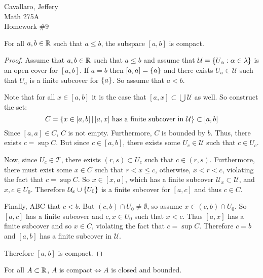\documentclass[letterpaper,12pt,fleqn]{article}
\newcommand{\T}{\mathscr{T}}
\newcommand{\U}{\mathcal{U}}
\renewcommand{\a}{\alpha}
\renewcommand{\l}{\lambda}
\begin{document}
Cavallaro, Jeffery \\
Math 275A \\
Homework \#9

\bigskip

\begin{theorem}[6.14]
  For all \(a,b\in\mathbb{R}\) such that \(a\le b\), the subspace \([a,b]\) is compact.
\end{theorem}

\begin{proof}
  Assume that \(a,b\in\mathbb{R}\) such that \(a\le b\) and assume that \(\U=\set{U_{\a}:\a\in\l}\) is an open cover for
  \([a,b]\).  If \(a=b\) then \([a,a]=\{a\}\) and there exists \(U_a\in\U\) such that \(U_a\) is a finite subcover
  for \(\{a\}\).  So assume that \(a<b\).

  Note that for all \(x\in[a,b]\) it is the case that \([a,x]\subset\bigcup\U\) as well.  So construct the set:
  \[C=\setb{x\in[a,b]}{[a,x]\ \text{has a finite subcover in}\ \U}\subset[a,b]\]
  Since \([a,a]\in C\), \(C\) is not empty.  Furthermore, \(C\) is bounded by \(b\).  Thus, there exists
  \(c=\sup C\).  But since \(c\in[a,b]\), there exists some \(U_c\in\U\) such that \(c\in U_c\).

  Now, since \(U_c\in\T\), there exists \((r,s)\subset U_c\) such that \(c\in(r,s)\).  Furthermore, there must
  exist some \(x\in C\) such that \(r<x\le c\), otherwise, \(x<r<c\), violating the fact that \(c=\sup C\).  So
  \(x\in[x,a]\), which has a finite subcover \(\U_x\subset\U\), and \(x,c\in U_0\).  Therefore \(\U_x\cup\set{U_0}\)
  is a finite subcover for \([a,c]\) and thus \(c\in C\).

  Finally, ABC that \(c<b\).  But \((c,b)\cap U_0\ne\emptyset\), so assume \(x\in(c,b)\cap U_0\).  So \([a,c]\) has
  a finite subcover and \(c,x\in U_0\) such that \(x<c\).  Thus \([a,x]\) has a finite subcover and so \(x\in C\),
  violating the fact that \(c=\sup C\).  Therefore \(c=b\) and \([a,b]\) has a finite subcover in \(\U\).

  Therefore \([a,b]\) is compact.
\end{proof}

\begin{theorem}[6.15]
  For all \(A\subset\mathbb{R}\), \(A\) is compact\(\iff A\) is closed and bounded.
\end{theorem}
\end{document}
